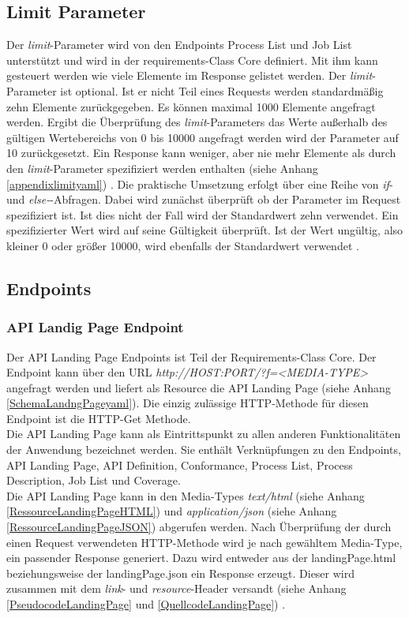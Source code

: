 \subsection{Limit Parameter}
Der \textit{limit}-Parameter wird von den Endpoints Process List und Job List unterstützt
und wird in der requirements-Class Core definiert. Mit ihm kann gesteuert werden wie viele Elemente im Response gelistet werden. 
Der \textit{limit}-Parameter ist optional. Ist er nicht Teil eines Requests werden standardmäßig zehn Elemente zurückgegeben. Es können maximal 1000 Elemente angefragt werden.
Ergibt die Überprüfung des \textit{limit}-Parameters das Werte außerhalb des gültigen Wertebereichs von 0 bis 10000 angefragt werden wird der Parameter auf 10 zurückgesetzt. 
Ein Response kann weniger, aber nie mehr Elemente als durch den \textit{limit}-Parameter spezifiziert werden enthalten (siehe Anhang \ref{appendixlimityaml}) 
\cite{ogc_api_processes_core}. Die praktische Umsetzung erfolgt über eine Reihe von \textit{if}- und \textit{else-}-Abfragen. Dabei wird zunächst überprüft ob 
der Parameter im Request spezifiziert ist. Ist dies nicht der Fall wird der Standardwert zehn verwendet. Ein spezifizierter Wert wird auf seine Gültigkeit überprüft. 
Ist der Wert ungültig, also kleiner 0 oder größer 10000, wird ebenfalls der Standardwert verwendet \cite{ogc_api_processes_core}.

\subsection{Endpoints}
\subsubsection{API Landig Page Endpoint}
Der API Landing Page Endpoints ist Teil der Requirements-Class Core.
Der Endpoint kann über den URL \textit{http://HOST:PORT/?f=<MEDIA-TYPE>} angefragt werden und liefert als Resource die 
API Landing Page (siehe Anhang \ref{SchemaLandngPageyaml}). 
Die einzig zulässige HTTP-Methode für diesen Endpoint ist die HTTP-Get Methode.\\ 
Die API Landing Page kann als Eintrittspunkt zu allen anderen Funktionalitäten der Anwendung bezeichnet werden. Sie enthält Verknüpfungen zu den Endpoints, 
API Landing Page, API Definition, Conformance, Process List, Process Description, Job List und Coverage.\\
Die API Landing Page kann in den Media-Types \textit{text/html} (siehe Anhang \ref{RessourceLandingPageHTML}) und \textit{application/json} 
(siehe Anhang \ref{RessourceLandingPageJSON}) abgerufen werden.
Nach Überprüfung der durch einen Request verwendeten HTTP-Methode wird je nach gewähltem Media-Type, ein passender Response generiert. 
Dazu wird entweder aus der landingPage.html beziehungsweise der landingPage.json ein Response erzeugt.
Dieser wird zusammen mit dem \textit{link}- und \textit{resource}-Header
versandt (siehe Anhang \ref{PseudocodeLandingPage} und \ref{QuellcodeLandingPage}) \cite{ogc_api_processes_core}. 

